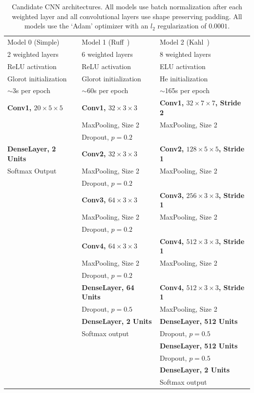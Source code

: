 \begin{table}[h!t]
\begin{center}
\begin{tabular}{l l l}
\toprule
Model 0 (Simple) & Model 1 (Ruff~\cite{ruff2020automated}) & Model 2 (Kahl~\cite{kahl2017large}) \\[0.5ex]
2 weighted layers & 6 weighted layers & 8 weighted layers \\[0.5ex]
ReLU activation & ReLU activation & ELU activation \\[0.5ex]
Glorot initialization & Glorot initialization & He initialization \\[0.5ex]
$\sim$3s per epoch & $\sim$60s per epoch & $\sim$165s per epoch \\[0.5ex]
\midrule
\textbf{Conv1, $20 \times 5 \times 5$} &
\textbf{Conv1, $32 \times 3 \times 3$} &
\textbf{Conv1, $32 \times 7 \times 7$, Stride 2} \\
& MaxPooling, Size 2 & MaxPooling, Size 2 \\
& Dropout, $p=0.2$ & \\[1ex]
\textbf{DenseLayer, 2 Units} &
\textbf{Conv2, $32 \times 3 \times 3$} &
\textbf{Conv2, $128 \times 5 \times 5$, Stride 1} \\
Softmax Output & MaxPooling, Size 2 & MaxPooling, Size 2 \\
& Dropout, $p=0.2$ & \\[1ex]
& \textbf{Conv3, $64 \times 3 \times 3$} &
\textbf{Conv3, $256 \times 3 \times 3$, Stride 1} \\
& MaxPooling, Size 2 & MaxPooling, Size 2 \\
& Dropout, $p=0.2$ & \\[1ex]
& \textbf{Conv4, $64 \times 3 \times 3$} &
\textbf{Conv4, $512 \times 3 \times 3$, Stride 1} \\
& MaxPooling, Size 2 & MaxPooling, Size 2 \\
& Dropout, $p=0.2$ & \\[1ex]
& \textbf{DenseLayer, 64 Units} &
\textbf{Conv4, $512 \times 3 \times 3$, Stride 1} \\
& Dropout, $p=0.5$ & MaxPooling, Size 2 \\[1ex]
& \textbf{DenseLayer, 2 Units} &
\textbf{DenseLayer, 512 Units} \\
& Softmax output & Dropout, $p=0.5$ \\[1ex]
& & \textbf{DenseLayer, 512 Units} \\
& & Dropout, $p=0.5$ \\[1ex]
& & \textbf{DenseLayer, 2 Units} \\
& & Softmax output \\[1ex]
\bottomrule
\end{tabular}
\caption{Candidate CNN architectures. All models use batch normalization after
each weighted layer and all convolutional layers use shape preserving
padding. All models use the `Adam' optimizer with an $l_2$ regularization of
$0.0001$.}\label{table:cnn_architectures}
\end{center}
\end{table}

